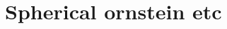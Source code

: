 \documentclass[thesis.tex]{subfiles}
\begin{document}
\chapter{Spherical ornstein etc}
\end{document}
